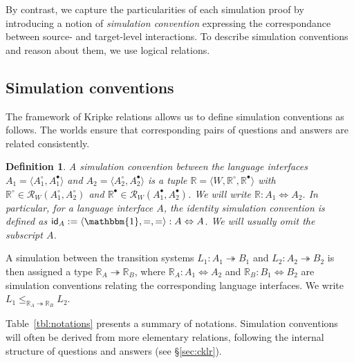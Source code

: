 \documentclass[draft,11pt]{report}
\newtheorem{definition}{Definition}
\newcommand{\kw}[1]{\ensuremath{ \mathsf{#1} }}
\newcommand{\que}{\circ}         %
\newcommand{\ans}{\bullet}       %
\begin{document}
By contrast,
we capture the particularities of each simulation proof
by introducing a notion of \emph{simulation convention}
expressing the correspondance between
source- and target-level interactions.
To describe simulation conventions
and reason about them,
we use logical relations.



\subsection{Simulation conventions} \label{sec:simconv} %

The framework of Kripke relations allows us
to define simulation conventions as follows.
The worlds ensure that corresponding pairs of
questions and answers are related consistently.

\begin{definition} \label{def:simconv} %
A \emph{simulation convention} between the language interfaces
$A_1 = \langle A_1^\que, A_1^\ans \rangle$ and
$A_2 = \langle A_2^\que, A_2^\ans \rangle$
is a tuple $\mathbb{R} = \langle W, \mathbb{R}^\que, \mathbb{R}^\ans \rangle$
with $\mathbb{R}^\que \in \mathcal{R}_W(A_1^\que, A_2^\que)$
and $\mathbb{R}^\ans \in \mathcal{R}_W(A_1^\ans, A_2^\ans)$.
We will write $\mathbb{R} : A_1 \Leftrightarrow A_2$.
In particular,
for a language interface $A$,
the \emph{identity} simulation convention
is defined as
$\kw{id}_A := \langle \mathbbm{1}, {=}, {=} \rangle
  : A \Leftrightarrow A$.
We will usually omit the subscript $A$.
\end{definition}

A simulation between the transition systems
$L_1 : A_1 \twoheadrightarrow B_1$ and
$L_2 : A_2 \twoheadrightarrow B_2$
is then assigned a type $\mathbb{R}_A \twoheadrightarrow \mathbb{R}_B$,
where %
$\mathbb{R}_A : A_1 \Leftrightarrow A_2$ and
$\mathbb{R}_B : B_1 \Leftrightarrow B_2$
are simulation conventions
relating the corresponding language interfaces.
We write
$L_1 \le_{\mathbb{R}_A \twoheadrightarrow \mathbb{R}_B} L_2$.

Table~\ref{tbl:notations} presents a summary of notations.
Simulation conventions
will often be derived from
more elementary relations,
following the internal structure of questions and answers
(see \S\ref{sec:cklr}).
\end{document}
